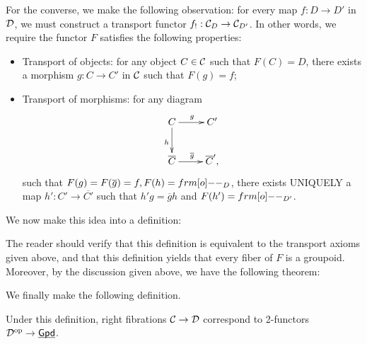 For the converse, we make the following observation: for every map $f:D\to D'$ in $\mathcal{D}$, we must construct a transport functor
$f_!:\mathcal{C}_D\to\mathcal{C}_{D'}$. In other words, we require the functor $F$ satisfies the following properties:
\begin{itemize}
    \item Transport of objects: for any object $C\in\mathcal{C}$ such that $F(C)=D$, there exists a morphism $g:C\to C'$
    in $\mathcal{C}$ such that $F(g)=f$;
    \item Transport of morphisms: for any diagram $$\xymatrix{C\ar[r]^{g}\ar[d]_{h}&C'\\\overline{C}\ar[r]^{\overline{g}}&\overline{C}',}$$
    such that $F(g)=F(\overline g)=f,F(h)=\1_D$, there exists UNIQUELY a map $h':C'\to\overline{C'}$ such that $h'g=\overline{g}h$
    and $F(h')=\1_{D'}$.
\end{itemize}
We now make this idea into a definition:


The reader should verify that this definition is equivalent to the transport axioms given above, and that this definition
yields that every fiber of $F$ is a groupoid. Moreover, by the discussion given above, we have the following theorem:


We finally make the following definition.


Under this definition, right fibrations $\mathcal{C}\to\mathcal{D}$ correspond to 2-functors $\mathcal{D}^{\mathrm{op}}\to\underline{\smash{\mathsf{Gpd}}}$.

